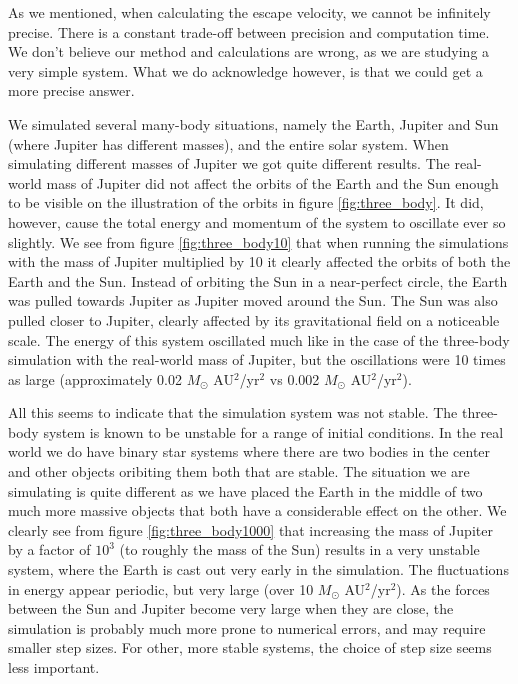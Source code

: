 \documentclass[reprint, english,notitlepage,nofootinbib]{revtex4-1}  %
\begin{document}
As we mentioned, when calculating the escape velocity, we cannot be infinitely precise. There is a constant trade-off between precision and computation time. We don't believe our method and calculations are wrong, as we are studying a very simple system. What we do acknowledge however, is that we could get a more precise answer.

We simulated several many-body situations, namely the Earth, Jupiter and Sun (where Jupiter has different masses), and the entire solar system. When simulating different masses of Jupiter we got quite different results. The real-world mass of Jupiter did not affect the orbits of the Earth and the Sun enough to be visible on the illustration of the orbits in figure \ref{fig:three_body}. It did, however, cause the total energy and momentum of the system to oscillate ever so slightly. We see from figure \ref{fig:three_body10} that when running the simulations with the mass of Jupiter multiplied by 10 it clearly affected the orbits of both the Earth and the Sun. Instead of orbiting the Sun in a near-perfect circle, the Earth was pulled towards Jupiter as Jupiter moved around the Sun. The Sun was also pulled closer to Jupiter, clearly affected by its gravitational field on a noticeable scale. The energy of this system oscillated much like in the case of the three-body simulation with the real-world mass of Jupiter, but the oscillations were 10 times as large (approximately 0.02 $M_\odot$ AU$^2$/yr$^2$ vs 0.002 $M_\odot$ AU$^2$/yr$^2$).

All this seems to indicate that the simulation system was not stable. The three-body system is known to be unstable for a range of initial conditions. In the real world we do have binary star systems where there are two bodies in the center and other objects oribiting them both that are stable. The situation we are simulating is quite different as we have placed the Earth in the middle of two much more massive objects that both have a considerable effect on the other. We clearly see from figure \ref{fig:three_body1000} that increasing the mass of Jupiter by a factor of $10^3$ (to roughly the mass of the Sun) results in a very unstable system, where the Earth is cast out very early in the simulation. The fluctuations in energy appear periodic, but very large (over 10 $M_\odot$ AU$^2$/yr$^2$). As the forces between the Sun and Jupiter become very large when they are close, the simulation is probably much more prone to numerical errors, and may require smaller step sizes. For other, more stable systems, the choice of step size seems less important.
\end{document}
